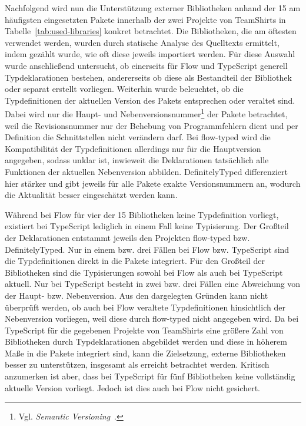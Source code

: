 Nachfolgend wird nun die Unterstützung externer Bibliotheken anhand der 15 am häufigsten eingesetzten Pakete innerhalb der zwei Projekte von TeamShirts in Tabelle~\ref{tab:used-libraries} konkret betrachtet. Die Bibliotheken, die am öftesten verwendet werden, wurden durch statische Analyse des Quelltexts ermittelt, indem gezählt wurde, wie oft diese jeweils importiert werden. Für diese Auswahl wurde anschließend untersucht, ob einerseits für Flow und TypeScript generell Typdeklarationen bestehen, andererseits ob diese als Bestandteil der Bibliothek oder separat erstellt vorliegen. Weiterhin wurde beleuchtet, ob die Typdefinitionen der aktuellen Version des Pakets entsprechen oder veraltet sind. Dabei wird nur die Haupt- und Nebenversionsnummer\footnote{Vgl. \textit{Semantic Versioning}~\autocite{SEMANTIC_VERSIONING}.} der Pakete betrachtet, weil die Revisionsnummer nur der Behebung von Programmfehlern dient und per Definition die Schnittstellen nicht verändern darf. Bei flow-typed wird die Kompatibilität der Typdefinitionen allerdings nur für die Hauptversion angegeben, sodass unklar ist, inwieweit die Deklarationen tatsächlich alle Funktionen der aktuellen Nebenversion abbilden. DefinitelyTyped differenziert hier stärker und gibt jeweils für alle Pakete exakte Versionsnummern an, wodurch die Aktualität besser eingeschätzt werden kann.



Während bei Flow für vier der 15 Bibliotheken keine Typdefinition vorliegt, existiert bei TypeScript lediglich in einem Fall keine Typisierung. Der Großteil der Deklarationen entstammt jeweils den Projekten flow-typed bzw. DefinitelyTyped. Nur in einem bzw. drei Fällen bei Flow bzw. TypeScript sind die Typdefinitionen direkt in die Pakete integriert.
Für den Großteil der Bibliotheken sind die Typisierungen sowohl bei Flow als auch bei TypeScript aktuell. Nur bei TypeScript besteht in zwei bzw. drei Fällen eine Abweichung von der Haupt- bzw. Nebenversion. Aus den dargelegten Gründen kann nicht überprüft werden, ob auch bei Flow veraltete Typdefinitionen hinsichtlich der Nebenversion vorliegen, weil diese durch flow-typed nicht angegeben wird. Da bei TypeScript für die gegebenen Projekte von TeamShirts eine größere Zahl von Bibliotheken durch Typdeklarationen abgebildet werden und diese in höherem Maße in die Pakete integriert sind, kann die Zielsetzung, externe Bibliotheken besser zu unterstützen, insgesamt als erreicht betrachtet werden. Kritisch anzumerken ist aber, dass bei TypeScript für fünf Bibliotheken keine vollständig aktuelle Version vorliegt. Jedoch ist dies auch bei Flow nicht gesichert.

